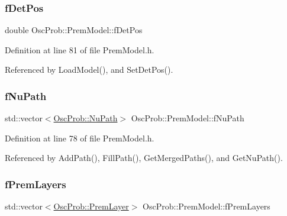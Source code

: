 \subsubsection{\texorpdfstring{f\+Det\+Pos}{fDetPos}}
{\footnotesize\ttfamily double Osc\+Prob\+::\+Prem\+Model\+::f\+Det\+Pos\hspace{0.3cm}{\ttfamily [protected]}}



Definition at line 81 of file Prem\+Model.\+h.



Referenced by Load\+Model(), and Set\+Det\+Pos().

\mbox{\label{classOscProb_1_1PremModel_aaf3c77e35798d664853157013c90ad2b}} 
\subsubsection{\texorpdfstring{f\+Nu\+Path}{fNuPath}}
{\footnotesize\ttfamily std\+::vector$<$\hyperlink{structOscProb_1_1NuPath}{Osc\+Prob\+::\+Nu\+Path}$>$ Osc\+Prob\+::\+Prem\+Model\+::f\+Nu\+Path\hspace{0.3cm}{\ttfamily [protected]}}



Definition at line 78 of file Prem\+Model.\+h.



Referenced by Add\+Path(), Fill\+Path(), Get\+Merged\+Paths(), and Get\+Nu\+Path().

\mbox{\label{classOscProb_1_1PremModel_a19a9a3b23ec154ad7a29f92b74aa5bc6}} 
\subsubsection{\texorpdfstring{f\+Prem\+Layers}{fPremLayers}}
{\footnotesize\ttfamily std\+::vector$<$\hyperlink{structOscProb_1_1PremLayer}{Osc\+Prob\+::\+Prem\+Layer}$>$ Osc\+Prob\+::\+Prem\+Model\+::f\+Prem\+Layers\hspace{0.3cm}{\ttfamily [protected]}}



